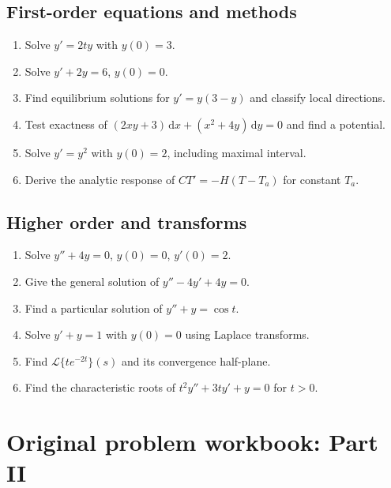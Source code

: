 \documentclass[11pt,letterpaper,oneside]{report}
\theoremstyle{definition}\newtheorem{definition}[theorem]{Definition}
\theoremstyle{remark}\newtheorem{remark}[theorem]{Remark}
\newcommand{\dd}{\,\mathrm{d}}
\newcommand{\lap}{\mathcal{L}}
\begin{document}
\section{First-order equations and methods}
\begin{enumerate}[label=\textbf{P\arabic*.}]
\item Solve $y'=2t y$ with $y(0)=3$.
\item Solve $y'+2y=6$, $y(0)=0$.
\item Find equilibrium solutions for $y'=y(3-y)$ and classify local directions.
\item Test exactness of $(2xy+3)\dd x+(x^2+4y)\dd y=0$ and find a potential.
\item Solve $y'=y^2$ with $y(0)=2$, including maximal interval.
\item Derive the analytic response of $C T'=-H(T-T_a)$ for constant $T_a$.
\end{enumerate}
\section{Higher order and transforms}
\begin{enumerate}[label=\textbf{P\arabic*.},start=7]
\item Solve $y''+4y=0$, $y(0)=0$, $y'(0)=2$.
\item Give the general solution of $y''-4y'+4y=0$.
\item Find a particular solution of $y''+y=\cos t$.
\item Solve $y'+y=1$ with $y(0)=0$ using Laplace transforms.
\item Find $\lap\{te^{-2t}\}(s)$ and its convergence half-plane.
\item Find the characteristic roots of $t^2y''+3ty'+y=0$ for $t>0$.
\end{enumerate}
\chapter{Original problem workbook: Part II}
\end{document}
